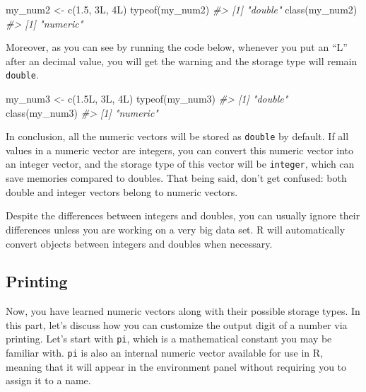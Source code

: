 \documentclass[
]{book}
\newenvironment{Shaded}{\begin{snugshade}}{\end{snugshade}}
\newcommand{\CommentTok}[1]{\textcolor[rgb]{0.56,0.35,0.01}{\textit{#1}}}
\newcommand{\FloatTok}[1]{\textcolor[rgb]{0.00,0.00,0.81}{#1}}
\newcommand{\FunctionTok}[1]{\textcolor[rgb]{0.00,0.00,0.00}{#1}}
\newcommand{\NormalTok}[1]{#1}
\newcommand{\OtherTok}[1]{\textcolor[rgb]{0.56,0.35,0.01}{#1}}
\newenvironment{blackbox}{
  \definecolor{shadecolor}{rgb}{0, 0, 0}  %
  \color{white}
  \begin{shaded}}
 {\end{shaded}}
\newenvironment{infobox}[1]
  {
  \begin{itemize}
  \renewcommand{\labelitemi}{
    \raisebox{-.7\height}[0pt][0pt]{
      {\setkeys{Gin}{width=3em,keepaspectratio}
        \texttt{[image: pics/\#1]}}
    }
  }
  \setlength{\fboxsep}{1em}
  \begin{blackbox}
  \item
  }
  {
  \end{blackbox}
  \end{itemize}
  }
\begin{document}
\begin{Shaded}
\begin{Highlighting}[]
\NormalTok{my\_num2 }\OtherTok{\textless{}{-}} \FunctionTok{c}\NormalTok{(}\FloatTok{1.5}\NormalTok{, 3L, 4L)}
\FunctionTok{typeof}\NormalTok{(my\_num2) }
\CommentTok{\#\textgreater{} [1] "double"}
\FunctionTok{class}\NormalTok{(my\_num2)}
\CommentTok{\#\textgreater{} [1] "numeric"}
\end{Highlighting}
\end{Shaded}

Moreover, as you can see by running the code below, whenever you put an ``L'' after an decimal value, you will get the warning and the storage type will remain \texttt{double}.

\begin{Shaded}
\begin{Highlighting}[]
\NormalTok{my\_num3 }\OtherTok{\textless{}{-}} \FunctionTok{c}\NormalTok{(}\FloatTok{1.5}\NormalTok{L, 3L, 4L)}
\FunctionTok{typeof}\NormalTok{(my\_num3)}
\CommentTok{\#\textgreater{} [1] "double"}
\FunctionTok{class}\NormalTok{(my\_num3)}
\CommentTok{\#\textgreater{} [1] "numeric"}
\end{Highlighting}
\end{Shaded}

In conclusion, all the numeric vectors will be stored as \texttt{double} by default. If all values in a numeric vector are integers, you can convert this numeric vector into an integer vector, and the storage type of this vector will be \texttt{integer}, which can save memories compared to doubles. That being said, don't get confused: both double and integer vectors belong to numeric vectors.

\begin{infobox}{caution}
Despite the differences between integers and doubles, you can usually ignore their differences unless you are working on a very big data set. R will automatically convert objects between integers and doubles when necessary.

\end{infobox}

\hypertarget{printing}{%
\subsection{Printing}\label{printing}}

Now, you have learned numeric vectors along with their possible storage types. In this part, let's discuss how you can customize the output digit of a number via printing. Let's start with \texttt{pi}, which is a mathematical constant you may be familiar with. \texttt{pi} is also an internal numeric vector available for use in R, meaning that it will appear in the environment panel without requiring you to assign it to a name.
\end{document}
